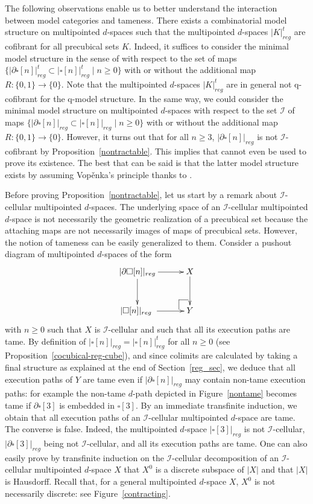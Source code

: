 \documentclass[a4paper,12pt]{amsart}
\makeatletter
\newcommand{\de}{\partial}
\theoremstyle{definition}
\newcommand{\fr}[1]{\ar@{->}[r]^-{#1}}
\newcommand{\fd}[1]{\ar@{->}[d]_-{#1}}
\renewcommand{\geq}{\geqslant}
\def\cocartesien{%
	\ar@{-}[]+L+<-6pt,+2pt>;[]+LU+<-6pt,+6pt>%
	\ar@{-}[]+U+<-2pt,+6pt>;[]+LU+<-6pt,+6pt>%
}
\makeatother
\begin{document}
The following observations enable us to better understand the interaction between model categories and tameness. There exists a combinatorial model structure on multipointed $d$-spaces such that the multipointed $d$-spaces $|K|^t_{reg}$ are cofibrant for all precubical sets $K$. Indeed, it suffices to consider the minimal model structure in the sense of \cite[Theorem~1.4]{henry2020minimal} with respect to the set of maps $\{|\de\square[n]|^t_{reg}\subset |\square[n]|^t_{reg}\mid n\geq 0\}$ with or without the additional map $R:\{0,1\}\to \{0\}$. Note that the multipointed $d$-spaces $|K|^t_{reg}$ are in general not q-cofibrant for the q-model structure. In the same way, we could consider the minimal model structure on multipointed $d$-spaces with respect to the set $\mathcal{I}$ of maps $\{|\de\square[n]|_{reg}\subset |\square[n]|_{reg}\mid n\geq 0\}$ with or without the additional map $R:\{0,1\}\to \{0\}$. However, it turns out that for all $n\geq 3$, $|\de\square[n]|_{reg}$ is not $\mathcal{I}$-cofibrant by Proposition~\ref{nontractable}. This implies that \cite[Theorem~1.4]{henry2020minimal} cannot even be used to prove its existence. The best that can be said is that the latter model structure exists by assuming Vop\v{e}nka's principle thanks to \cite[Theorem~2.2]{rotho}. 

Before proving Proposition~\ref{nontractable}, let us start by a remark about $\mathcal{I}$-cellular multipointed $d$-spaces. The underlying space of an $\mathcal{I}$-cellular multipointed $d$-space is not necessarily the geometric realization of a precubical set because the attaching maps are not necessarily images of maps of precubical sets. However, the notion of tameness can be easily generalized to them. Consider a pushout diagram of multipointed $d$-spaces of the form 
\[
\xymatrix@C=3em@R=3em
{
	|\de\square[n]|_{reg} \fd{}\fr{} & X \fd{}\\
	|\square[n]|_{reg} \fr{} & \cocartesien Y
}
\]
with $n\geq 0$ such that $X$ is $\mathcal{I}$-cellular and such that all its execution paths are tame. By definition of $|\square[n]|_{reg} = |\square[n]|^t_{reg}$ for all $n\geq 0$ (see Proposition~\ref{cocubical-reg-cube}), and since colimits are calculated by taking a final structure as explained at the end of Section~\ref{reg_sec}, we deduce that all execution paths of $Y$ are tame even if $|\de\square[n]|_{reg}$ may contain non-tame execution paths: for example the non-tame $d$-path depicted in Figure~\ref{nontame} becomes tame if $\de\square[3]$ is embedded in $\square[3]$. By an immediate transfinite induction, we obtain that all execution paths of an $\mathcal{I}$-cellular multipointed $d$-space are tame. The converse is false. Indeed, the multipointed $d$-space $|\square[3]|_{reg}$ is not $\mathcal{I}$-cellular, $|\de\square[3]|_{reg}$ being not $\mathcal{I}$-cellular, and all its execution paths are tame. One can also easily prove by transfinite induction on the $\mathcal{I}$-cellular decomposition of an $\mathcal{I}$-cellular multipointed $d$-space $X$ that $X^0$ is a discrete subspace of $|X|$ and that $|X|$ is Hausdorff. Recall that, for a general multipointed $d$-space $X$, $X^0$ is not necessarily discrete: see Figure~\ref{contracting}. 
\end{document}
